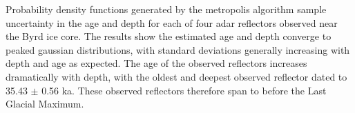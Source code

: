 
Probability density functions generated by the metropolis algorithm sample uncertainty in the age and depth for each of four adar reflectors observed near the Byrd ice core. The results show the estimated age and depth converge to peaked gaussian distributions, with standard deviations generally increasing with depth and age as expected. The age of the observed reflectors increases dramatically with depth, with the oldest and deepest observed reflector dated to 35.43 $\pm$ 0.56 ka. These observed reflectors therefore span to before the Last Glacial Maximum.


